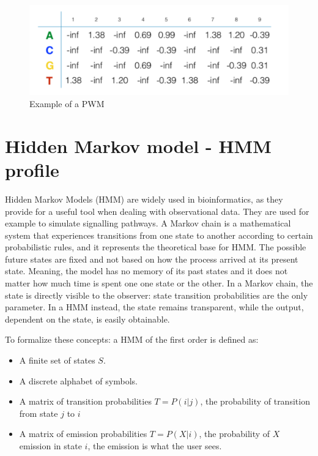 		\begin{figure}[H]
			\centering
			\includegraphics[scale=0.3]{pwm.png}
			\caption{Example of a PWM}
			\label{fig:pwm}
			\end{figure}


	\section{Hidden Markov model - HMM profile}
	Hidden Markov Models (HMM) are widely used in bioinformatics, as they provide for a useful tool when dealing with observational data.
	They are used for example to simulate signalling pathways.
	A Markov chain is a mathematical system that experiences transitions from one state to another according to certain probabilistic rules, and it represents the theoretical base for HMM.
	The possible future states are fixed and not based on how the process arrived at its present state.
	Meaning, the model has no memory of its past states and it does not matter how much time is spent one one state or the other.
	In a Markov chain, the state is directly visible to the observer: state transition probabilities are the only parameter.
	In a HMM instead, the state remains transparent, while the output, dependent on the state, is easily obtainable.

	To formalize these concepts: a HMM of the first order is defined as:
	\begin{multicols}{2}
		\begin{itemize}
			\item A finite set of states $S$.
			\item A discrete alphabet of symbols.
			\item A matrix of transition probabilities $T = P(i|j)$, the probability of transition from state $j$ to $i$
			\item A matrix of emission probabilities $T = P(X|i)$, the probability of $X$ emission in state $i$, the emission is what the user sees.
		\end{itemize}
	\end{multicols}

